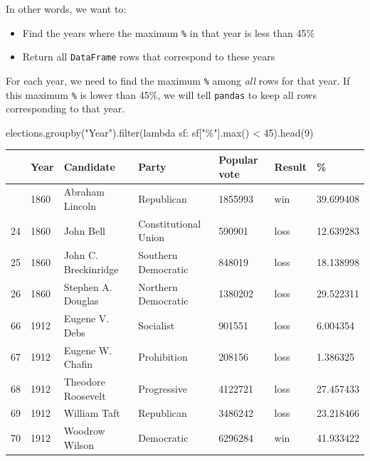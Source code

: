 \documentclass[
  letterpaper,
  DIV=11,
  numbers=noendperiod]{scrreprt}
\newenvironment{Shaded}{\begin{snugshade}}{\end{snugshade}}
\newcommand{\BuiltInTok}[1]{\textcolor[rgb]{0.00,0.23,0.31}{#1}}
\newcommand{\DecValTok}[1]{\textcolor[rgb]{0.68,0.00,0.00}{#1}}
\newcommand{\KeywordTok}[1]{\textcolor[rgb]{0.00,0.23,0.31}{#1}}
\newcommand{\NormalTok}[1]{\textcolor[rgb]{0.00,0.23,0.31}{#1}}
\newcommand{\OperatorTok}[1]{\textcolor[rgb]{0.37,0.37,0.37}{#1}}
\newcommand{\StringTok}[1]{\textcolor[rgb]{0.13,0.47,0.30}{#1}}
\providecommand{\tightlist}{%
  \setlength{\itemsep}{0pt}\setlength{\parskip}{0pt}}\usepackage{longtable,booktabs,array}
\begin{document}
In other words, we want to:

\begin{itemize}
\tightlist
\item
  Find the years where the maximum \texttt{\%} in that year is less than
  45\%
\item
  Return all \texttt{DataFrame} rows that correspond to these years
\end{itemize}

For each year, we need to find the maximum \texttt{\%} among \emph{all}
rows for that year. If this maximum \texttt{\%} is lower than 45\%, we
will tell \texttt{pandas} to keep all rows corresponding to that year.

\begin{Shaded}
\begin{Highlighting}[]
\NormalTok{elections.groupby(}\StringTok{"Year"}\NormalTok{).}\BuiltInTok{filter}\NormalTok{(}\KeywordTok{lambda}\NormalTok{ sf: sf[}\StringTok{"\%"}\NormalTok{].}\BuiltInTok{max}\NormalTok{() }\OperatorTok{\textless{}} \DecValTok{45}\NormalTok{).head(}\DecValTok{9}\NormalTok{)}
\end{Highlighting}
\end{Shaded}

\begin{longtable}[]{@{}lllllll@{}}
\toprule\noalign{}
& Year & Candidate & Party & Popular vote & Result & \% \\
\midrule\noalign{}
\endhead
\bottomrule\noalign{}
\endlastfoot
23 & 1860 & Abraham Lincoln & Republican & 1855993 & win & 39.699408 \\
24 & 1860 & John Bell & Constitutional Union & 590901 & loss &
12.639283 \\
25 & 1860 & John C. Breckinridge & Southern Democratic & 848019 & loss &
18.138998 \\
26 & 1860 & Stephen A. Douglas & Northern Democratic & 1380202 & loss &
29.522311 \\
66 & 1912 & Eugene V. Debs & Socialist & 901551 & loss & 6.004354 \\
67 & 1912 & Eugene W. Chafin & Prohibition & 208156 & loss & 1.386325 \\
68 & 1912 & Theodore Roosevelt & Progressive & 4122721 & loss &
27.457433 \\
69 & 1912 & William Taft & Republican & 3486242 & loss & 23.218466 \\
70 & 1912 & Woodrow Wilson & Democratic & 6296284 & win & 41.933422 \\
\end{longtable}
\end{document}

